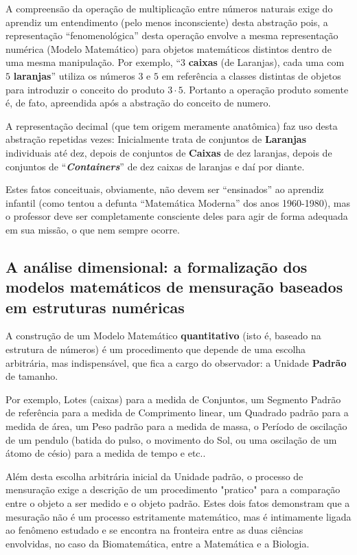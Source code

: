     A compreensão da operação de multiplicação entre números naturais exige do aprendiz um entendimento (pelo menos inconsciente) desta abstração pois, a representação ``fenomenológica'' desta operação envolve a mesma representação numérica (Modelo Matemático) para objetos matemáticos distintos dentro de uma mesma manipulação. Por exemplo, ``\(3\) \textbf{caixas} (de Laranjas), cada uma com \(5\) \textbf{laranjas}'' utiliza os números \(3\) e \(5\) em referência a classes distintas de objetos para introduzir o conceito do produto \(3 \cdot 5\). Portanto a operação produto somente é, de fato, apreendida após a abstração do conceito de numero.

    A representação decimal (que tem origem meramente anatômica) faz uso desta abstração repetidas vezes: Inicialmente trata de conjuntos de \textbf{Laranjas} individuais até dez, depois de conjuntos de \textbf{Caixas} de dez laranjas, depois de conjuntos de ``\textit{\textbf{Containers}}'' de dez caixas de laranjas e daí por diante.

    Estes fatos conceituais, obviamente, não devem ser ``ensinados'' ao aprendiz infantil (como tentou a defunta ``Matemática Moderna'' dos anos 1960-1980), mas o professor deve ser completamente consciente deles para agir de forma adequada em sua missão, o que nem sempre ocorre.

\subsection{A análise dimensional: a formalização dos modelos matemáticos de mensuração baseados em estruturas numéricas}

    A construção de um Modelo Matemático \textbf{quantitativo} (isto é, baseado na estrutura de números) é um procedimento que depende de uma escolha arbitrária, mas indispensável, que fica a cargo do observador: a Unidade \textbf{Padrão} de tamanho.

    Por exemplo, Lotes (caixas) para a medida de Conjuntos, um Segmento Padrão de referência para a medida de Comprimento linear, um Quadrado padrão para a medida de área, um Peso padrão para a medida de massa, o Período de oscilação de um pendulo (batida do pulso, o movimento do Sol, ou uma oscilação de um átomo de césio) para a medida de tempo e etc..

    Além desta escolha arbitrária inicial da Unidade padrão, o processo de mensuração exige a descrição de um procedimento "pratico" para a comparação entre o objeto a ser medido e o objeto padrão. Estes dois fatos demonstram que a mesuração não é um processo estritamente matemático, mas é intimamente ligada ao fenômeno estudado e se encontra na fronteira entre as duas ciências envolvidas, no caso da Biomatemática, entre a Matemática e a Biologia.

